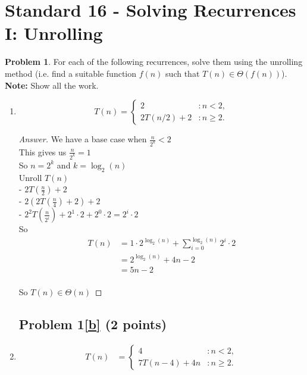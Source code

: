 \documentclass[11pt]{article}
\theoremstyle{definition}
\theoremstyle{definition}
\newtheorem{required}{Problem}
\theoremstyle{definition}
\begin{document}
\section{Standard 16 - Solving Recurrences I: Unrolling}
\begin{required} \label{unrolling}
For each of the following recurrences, solve them using the unrolling method (i.e. find a suitable function $f(n)$ such that $T(n) \in \Theta(f(n))$). \textbf{Note: } Show all the work.

\renewcommand{\theenumi}{\alph{enumi}}
\begin{enumerate}
\subsection{Problem 1\ref{a} (2 points)}
\item \label{a}
$$
T(n) = \begin{cases}
2 & : n < 2, \\
2T(n / 2) + 2 & : n \geq 2.
\end{cases}
$$

\begin{proof}[Answer]
We have a base case when $\frac{n}{2^k} < 2$\\
This gives us $\frac{n}{2^k} = 1$\\
So $n = 2^k$ and $k = \log_2(n)$\\

Unroll $T(n)$\\
- $2T(\frac{n}{2}) + 2$\\
- $2(2T(\frac{n}{4}) + 2) + 2$\\
- $2^{2}T(\frac{n}{2^i}) + 2^1 \cdot 2 + 2^0 \cdot 2 = 2^i \cdot 2$\\

So \\
\begin{align}
T(n) &= 1 \cdot 2^{\log_2(n)} + \displaystyle\sum_{i=0} ^{\log_2(n)} 2^i \cdot 2\\
&=2^{\log_2(n)} + 4n - 2\\
&= 5n - 2\\
\end{align}

So $T(n) \in \Theta(n)$
\end{proof}


\newpage
\subsection{Problem 1\ref{b} (2 points)}
\item \label{b}
\begin{align*}
T(n) &= \begin{cases} 
4 & : n < 2, \\
7T(n-4) + 4n & : n \geq 2.
\end{cases}
\end{align*}


\end{enumerate}
\end{required}
\end{document}
